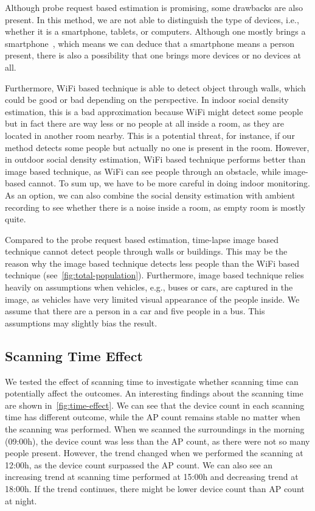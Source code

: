 	Although probe request based estimation is promising, some drawbacks are also present. In this method, we are not able to distinguish the type of devices, i.e., whether it is a smartphone, tablets, or computers. Although one mostly brings a smartphone~\cite{thesis047}, which means we can deduce that a smartphone means a person present, there is also a possibility that one brings more devices or no devices at all.

	Furthermore, WiFi based technique is able to detect object through walls, which could be good or bad depending on the perspective. In indoor social density estimation, this is a bad approximation because WiFi might detect some people but in fact there are way less or no people at all inside a room, as they are located in another room nearby. This is a potential threat, for instance, if our method detects some people but actually no one is present in the room. However, in outdoor social density estimation, WiFi based technique performs better than image based technique, as WiFi can see people through an obstacle, while image-based cannot. To sum up, we have to be more careful in doing indoor monitoring. As an option, we can also combine the social density estimation with ambient recording to see whether there is a noise inside a room, as empty room is mostly quite. 
	
	Compared to the probe request based estimation, time-lapse image based technique cannot detect people through walls or buildings. This may be the reason why the image based technique detects less people than the WiFi based technique (see~\autoref{fig:total-population}). Furthermore, image based technique relies heavily on assumptions when vehicles, e.g., buses or cars, are captured in the image, as vehicles have very limited visual appearance of the people inside. We assume that there are a person in a car and five people in a bus. This assumptions may slightly bias the result.

	\subsection{Scanning Time Effect} %
	\label{sub:scanning_time_effect}
	We tested the effect of scanning time to investigate whether scanning time can potentially affect the outcomes. An interesting findings about the scanning time are shown in~\autoref{fig:time-effect}. We can see that the device count in each scanning time has different outcome, while the \ac{AP} count remains stable no matter when the scanning was performed. When we scanned the surroundings in the morning (09:00h), the device count was less than the \ac{AP} count, as there were not so many people present. However, the trend changed when we performed the scanning at 12:00h, as the device count surpassed the \ac{AP} count. We can also see an increasing trend at scanning time performed at 15:00h and decreasing trend at 18:00h.
	If the trend continues, there might be lower device count than \ac{AP} count at night.


